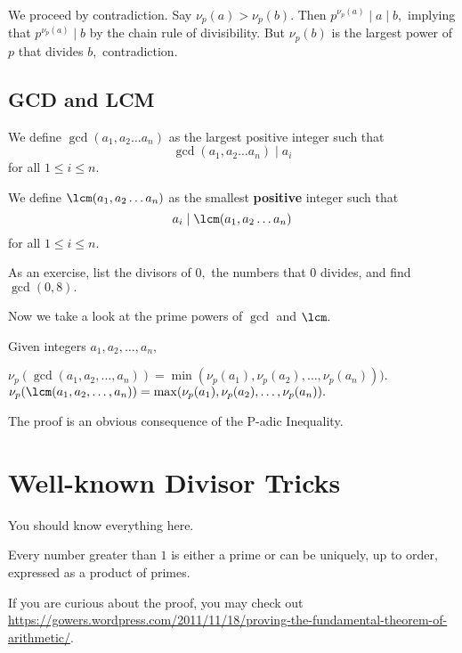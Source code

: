 \documentclass[mast]{lucky}
\begin{document}
\begin{pro}
We proceed by contradiction. Say $\nu_p(a)>\nu_p(b).$ Then $p^{\nu_p(a)}\mid a\mid b,$ implying that $p^{\nu_p(a)}\mid b$ by the chain rule of divisibility. But $\nu_p(b)$ is the largest power of $p$ that divides $b,$ contradiction.
\end{pro}

\subsection{GCD and LCM}
\begin{defi}We define $\gcd(a_1,a_2\dots a_n)$ as the largest positive integer such that \[\gcd(a_1,a_2\dots a_n)\mid a_i\] for all $1\leq i\leq n.$\end{defi}

\begin{defi}We define $\lcm(a_1,a_2\dots a_n)$ as the smallest \textbf{positive} integer such that \[a_i\mid \lcm(a_1,a_2\dots a_n)\] for all $1\leq i\leq n.$\end{defi}
As an exercise, list the divisors of $0,$ the numbers that $0$ divides, and find $\gcd(0,8).$

Now we take a look at the prime powers of $\gcd$ and $\lcm.$
\begin{fact}
Given integers $a_1,a_2,\ldots,a_n,$
\begin{itemize}
\Item $\nu_p(\gcd(a_1,a_2,\ldots,a_n))=\min(\nu_p(a_1),\nu_p(a_2),\ldots,\nu_p(a_n))).$
\Item $\nu_p(\lcm(a_1,a_2,\ldots,a_n))=\max(\nu_p(a_1),\nu_p(a_2),\ldots,\nu_p(a_n)).$
\end{itemize}
\end{fact}

The proof is an obvious consequence of the P-adic Inequality.

\section{Well-known Divisor Tricks}
You should know everything here.

\begin{theo}
Every number greater than $1$ is either a prime or can be uniquely, up to order, expressed as a product of primes.
\end{theo}

If you are curious about the proof, you may check out \url{https://gowers.wordpress.com/2011/11/18/proving-the-fundamental-theorem-of-arithmetic/}.
\end{document}
